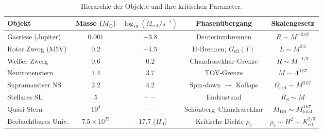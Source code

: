 \documentclass[11pt,a4paper]{article}
\begin{document}
	\begin{table}[htbp]
		\centering
		\caption{Hierarchie der Objekte und ihre kritischen Parameter.}
		\label{tab:hierarchy}
		\small
		\begin{tabular}{l c c c c}
			\toprule
			\textbf{Objekt} & \textbf{Masse (\(M_\odot\))} & \(\log_{10}(\Omega_{\mathrm{crit}}/\mathrm{s^{-1}})\) & \textbf{Phasenübergang} & \textbf{Skalengesetz} \\
			\midrule
			Gasriese (Jupiter) & \(0.001\) & \(-3.8\) & Deuteriumbrennen & \(R\sim M^{-0.67}\) \\
			Roter Zwerg (M5V) & \(0.2\) & \(-4.5\) & H‑Brennen; \(G_{\mathrm{eff}}(T)\) & \(L\sim M^{2.3}\) \\
			Weißer Zwerg & \(0.6\) & \(0.2\) & Chandrasekhar‑Grenze & \(R\sim M^{-1/3}\) \\
			Neutronenstern & \(1.4\) & \(3.7\) & TOV‑Grenze & \(M\sim\Lambda^{0.67}\) \\
			Supramassiver NS & \(2.2\) & \(4.2\) & Spin‑down \(\to\) Kollaps & \(\Omega_{\mathrm{crit}}\sim M^{0.67}\) \\
			Stellares SL & \(5\) & \(--\) & Endzustand & \(R_S\sim M\) \\
			Quasi‑Stern & \(10^4\) & \(--\) & Schönberg–Chandrasekhar & \(M_{\mathrm{BH}}\sim M_{\mathrm{total}}^{0.67}\) \\
			Beobachtbares Univ. & \(7.5\times10^{22}\) & \(-17.7\) (\(H_0\)) & Kritische Dichte \(\rho_c\) & \(\rho_c\sim H^2\sim K_{\mathrm{eff}}^{2/3}\) \\
			\bottomrule
		\end{tabular}
	\end{table}
	
\end{document}
